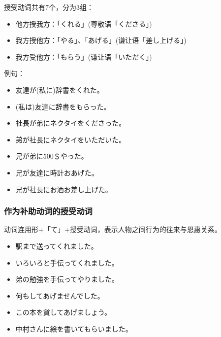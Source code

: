 授受动词共有7个，分为3组：
\begin{itemize}
  \item 他方授我方：「くれる」(尊敬语「くださる」)
  \item 我方授他方：「やる」、「あげる」(谦让语「差し上げる」)
  \item 我方受他方：「もらう」(谦让语「いただく」)
\end{itemize}

例句：
\begin{itemize}
  \item 友達が(私に)辞書をくれた。
  \item (私は)友達に辞書をもらった。
  \item 社長が弟にネクタイをくださった。
  \item 弟が社長にネクタイをいただいた。
  \item 兄が弟に500＄やった。
  \item 兄が友達に時計おあげた。
  \item 兄が社長にお酒お差し上げた。
\end{itemize}


\subsubsection{作为补助动词的授受动词}%

动词连用形+「て」+授受动词，表示人物之间行为的往来与恩惠关系。
\begin{itemize}
  \item 駅まで送ってくれました。
  \item いろいろと手伝ってくれました。
  \item 弟の勉強を手伝ってやりました。
  \item 何もしてあげませんでした。
  \item この本を貸してあげましょう。
  \item 中村さんに絵を書いてもらいました。
\end{itemize}



